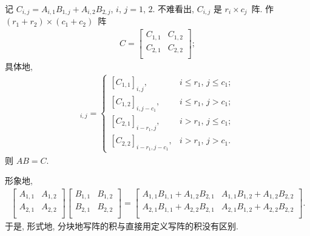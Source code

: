 \begin{theorem}
    记 \(C_{i,j} = A_{i,1} B_{1,j} + A_{i,2} B_{2,j}\),
    \(i\), \(j = 1\), \(2\).
    不难看出, \(C_{i,j}\) 是 \(r_i \times c_j\)~阵.
    作 \((r_1+r_2) \times (c_1+c_2)\)~阵
    \begin{align*}
        C = \begin{bmatrix}
                C_{1,1} & C_{1,2} \\
                C_{2,1} & C_{2,2} \\
            \end{bmatrix};
    \end{align*}
    具体地,
    \begin{align*}
        [C]_{i,j}
        = \begin{cases}
              [C_{1,1}]_{i,j},
               & \text{\(i \leq r_1\), \(j \leq c_1\)}; \\
              [C_{1,2}]_{i,j-c_1},
               & \text{\(i \leq r_1\), \(j > c_1\)};    \\
              [C_{2,1}]_{i-r_1,j},
               & \text{\(i > r_1\), \(j \leq c_1\)};    \\
              [C_{2,2}]_{i-r_1,j-c_1},
               & \text{\(i > r_1\), \(j > c_1\)}.
          \end{cases}
    \end{align*}
    则 \(AB = C\).

    形象地,
    \begin{align*}
        \begin{bmatrix}
            A_{1,1} & A_{1,2} \\
            A_{2,1} & A_{2,2} \\
        \end{bmatrix}
        \begin{bmatrix}
            B_{1,1} & B_{1,2} \\
            B_{2,1} & B_{2,2} \\
        \end{bmatrix}
        =
        \begin{bmatrix}
            A_{1,1} B_{1,1} + A_{1,2} B_{2,1}
             & A_{1,1} B_{1,2} + A_{1,2} B_{2,2} \\
            A_{2,1} B_{1,1} + A_{2,2} B_{2,1}
             & A_{2,1} B_{1,2} + A_{2,2} B_{2,2} \\
        \end{bmatrix}.
    \end{align*}
    于是, 形式地,
    分块地写阵的积与直接用定义写阵的积没有区别.


\end{theorem}
